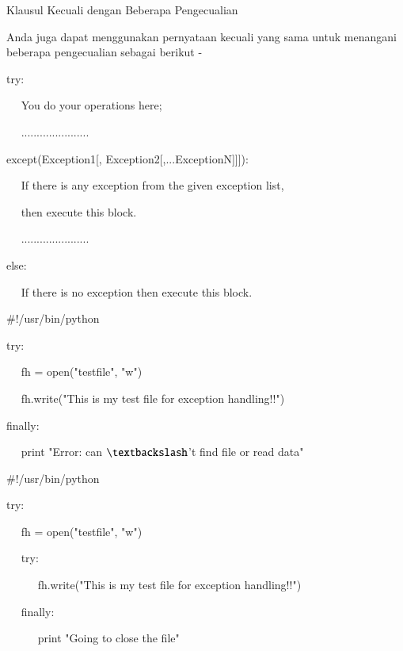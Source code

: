 \documentclass[a4paper,12pt]{report}
\begin{document}
\noindent 
Klausul Kecuali dengan Beberapa Pengecualian \par
\vspace{12pt}
\noindent 
Anda juga dapat menggunakan pernyataan kecuali yang sama untuk menangani beberapa pengecualian sebagai berikut - \par
\vspace{12pt}
\noindent 
try: \par
\noindent 
~~ You do your operations here; \par
\noindent 
~~ ...................... \par
\noindent 
except(Exception1[, Exception2[,...ExceptionN]]]): \par
\noindent 
~~ If there is any exception from the given exception list,  \par
\noindent 
~~ then execute this block. \par
\noindent 
~~ ...................... \par
\noindent 
else: \par
\noindent 
~~ If there is no exception then execute this block.  \par
\vspace{12pt}
\vspace{12pt}
\noindent 
 $  \#  $!/usr/bin/python \par
\vspace{12pt}
\noindent 
try: \par
\noindent 
~~ fh = open("testfile", "w") \par
\noindent 
~~ fh.write("This is my test file for exception handling!!") \par
\noindent 
finally: \par
\noindent 
~~ print "Error: can $  \textbackslash  $'t find file or read data" \par
\vspace{12pt}
\vspace{12pt}
\noindent 
 $  \#  $!/usr/bin/python \par
\vspace{12pt}
\noindent 
try: \par
\noindent 
~~ fh = open("testfile", "w") \par
\noindent 
~~ try: \par
\noindent 
~~~~~ fh.write("This is my test file for exception handling!!") \par
\noindent 
~~ finally: \par
\noindent 
~~~~~ print "Going to close the file" \par
\end{document}

